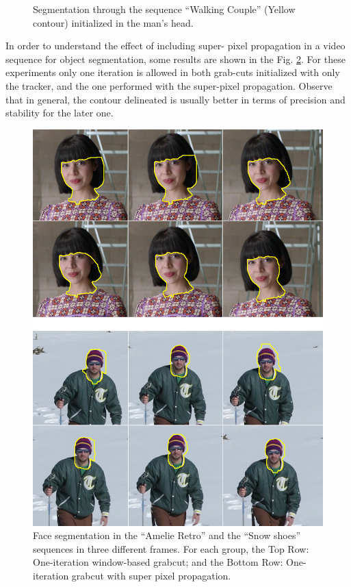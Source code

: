 \begin{figure}[thpb]
      \caption{Segmentation through the sequence “Walking
	       Couple” (Yellow contour) initialized in the man’s head.}
      \label{figurelabel_walking}
   \end{figure}

In order to understand the effect of including super-
pixel propagation in a video sequence for object
segmentation, some results are shown in the Fig.
\ref{figurelabel_comp}. For these experiments only one iteration is
allowed in both grab-cuts initialized with only the
tracker, and the one performed with the super-pixel
propagation. Observe that in general, the contour
delineated is usually better in terms of precision and
stability for the later one.

   \begin{figure}[thpb]
      \centering
      \includegraphics[height=0.4\textheight]{images/Compare.png}
      \caption{Face segmentation in the “Amelie Retro” and the
	      “Snow shoes” sequences in three different frames. For each
	       group, the Top Row: One-iteration window-based grabcut;
	       and the Bottom Row: One-iteration grabcut with super pixel
	       propagation.}
      \label{figurelabel_comp}
   \end{figure}